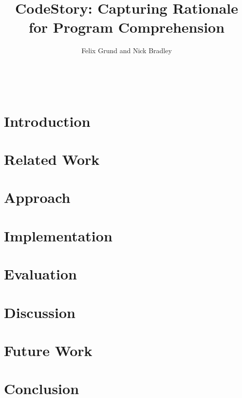 \documentclass{sig-alternate}
\begin{document}
\title{CodeStory: Capturing Rationale for Program Comprehension}

\author{
\alignauthor
Felix Grund and Nick Bradley \\
       \\
       \\
       \\
}
\maketitle

\begin{abstract}
  
\end{abstract}

%
%

\section{Introduction}
  \label{sec:introduction}
  
\section{Related Work}
  \label{sec:related-work}
  
\section{Approach}
  \label{sec:approach}
  
\section{Implementation}
  \label{sec:implementation}
  
\section{Evaluation}
  \label{sec:evaluation}
  
\section{Discussion}
  \label{sec:discussion}
  
\section{Future Work}
  \label{sec:future-work}
  
\section{Conclusion}
  \label{sec:conclusion}
  

  
  
\end{document}
